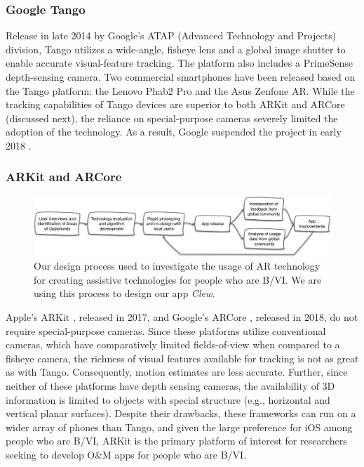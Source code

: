 \documentclass[chi_draft]{sigchi}
\newcommand{\BVI}{B/VI\xspace}
\newcommand{\OM}{O\&M\xspace}
\begin{document}
\subsubsection{Google Tango}
Release in late 2014 by Google's ATAP (Advanced Technology and Projects) division, Tango utilizes a wide-angle, fisheye lens and a global image shutter to enable accurate visual-feature tracking.  The platform also includes a PrimeSense depth-sensing camera.  Two commercial smartphones have been released based on the Tango platform: the Lenovo Phab2 Pro and the Asus Zenfone AR.  While the tracking capabilities of Tango devices are superior to both ARKit and ARCore (discussed next), the reliance on special-purpose cameras severely limited the adoption of the technology.  As a result, Google suspended the project in early 2018 \cite{tangoretired}.


\subsubsection{ARKit and ARCore}
\begin{figure}
\includegraphics[width=\linewidth]{Figures/designprocess}
\caption{Our design process used to investigate the usage of AR technology for creating assistive technologies for people who are \BVI.  We are using this process to design our app \emph{Clew}.\label{fig:designprocess}}
\end{figure}
Apple's ARKit \cite{arkit}, released in 2017, and Google's ARCore \cite{arcore}, released in 2018, do not require special-purpose cameras.  Since these platforms utilize conventional cameras, which have comparatively limited fields-of-view when compared to a fisheye camera, the richness of visual features available for tracking is not as great as with Tango.  Consequently, motion estimates are less accurate.  Further, since neither of these platforms have depth sensing cameras, the availability of 3D information is limited to objects with special structure (e.g., horizontal and vertical planar surfaces).  Despite their drawbacks, these frameworks can run on a wider array of phones than Tango, and given the large preference for iOS among people who are \BVI \cite{morris2014blind}, ARKit is the primary platform of interest for researchers seeking to develop \OM apps for people who are \BVI.
\end{document}
